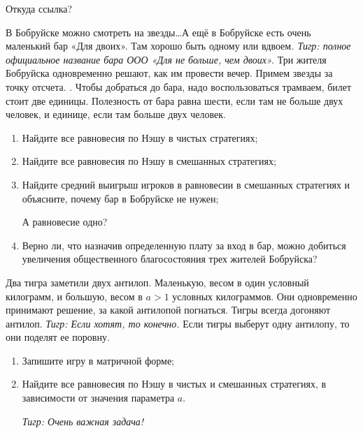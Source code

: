 \begin{problem}
\begin{source}
\cite[4.15]{gintis:gte} {\red  Откуда ссылка?}
\end{source}
В Бобруйске можно смотреть на звезды\ldots А ещё в Бобруйске есть очень маленький бар «Для двоих». Там хорошо быть одному или вдвоем{\it. Тигр: полное официальное название бара ООО «Для не больше, чем двоих».} Три жителя Бобруйска одновременно решают, как им провести вечер. Примем звезды за точку отсчета. {}. Чтобы добраться до бара, надо воспользоваться трамваем, билет стоит две единицы. Полезность от бара равна шести, если там не больше двух человек, и единице, если там больше двух человек.\par
\begin{enumerate}
\item  Найдите все равновесия по Нэшу в чистых стратегиях;\par
\item Найдите все равновесия по Нэшу в смешанных стратегиях;\par
\item  Найдите средний выигрыш игроков в равновесии в смешанных стратегиях и объясните, почему бар в Бобруйске не нужен;\par {\red А равновесие одно?}
\item Верно ли, что назначив определенную плату за вход в бар, можно добиться увеличения общественного благосостояния трех жителей Бобруйска?
\end{enumerate}


\begin{sol}

\end{sol}
\end{problem}






\begin{problem}
Два тигра заметили двух антилоп. Маленькую, весом в один условный килограмм, и большую, весом в  $a>1$  условных килограммов. Они одновременно принимают решение, за какой антилопой погнаться. Тигры всегда догоняют антилоп. {\it Тигр: Если хотят, то конечно.} Если тигры выберут одну антилопу, то они поделят ее поровну.\par
\begin{enumerate}
\item Запишите игру в матричной форме;\par
\item Найдите все равновесия по Нэшу в чистых и смешанных стратегиях, в зависимости от значения параметра $a$.\par
{\it Тигр: Очень важная задача!}\par
\end{enumerate}


\begin{sol}

\end{sol}
\end{problem}

